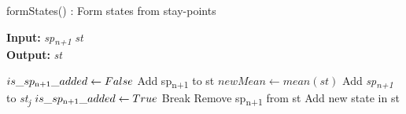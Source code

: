 \documentclass{article}
\begin{document}
\begin{algorithm}
\caption{formStates() : Form states from stay-points}
\label{pseudoPSO}
\hspace*{\algorithmicindent} \textbf{Input:}  \textit{sp\textsubscript{n+1}}  \textit{st} \\
\hspace*{\algorithmicindent} \textbf{Output:}  \textit{st}

\begin{algorithmic}[1]

\State $is\_sp\textsubscript{n+1}\_added \gets False$
	\State Add sp\textsubscript{n+1} to st
	\State $newMean \gets mean(\textit{st})$
		\State Add \textit{sp\textsubscript{n+1}} to \textit{st\textsubscript{j}}
		\State $is\_sp\textsubscript{n+1}\_added \gets True$ 
		\State Break
	\Else
		\State Remove sp\textsubscript{n+1} from st
	\EndIf
\EndIf
\EndFor
{}
\State Add new state in st
\EndIf
\end{algorithmic}
\end{algorithm}

\end{document}
